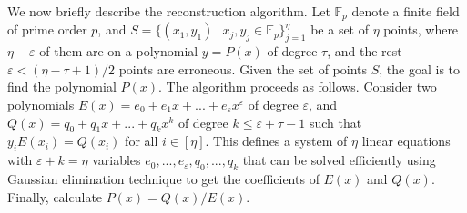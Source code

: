 \documentclass[letterpaper,twocolumn,10pt]{article}
\newcommand{\fullpaper}[1]{#1}
\newcommand{\fullpaper}[1]{}
\newcommand{\algFont}{\fontsize{10}{13}\selectfont}
\newcommand{\jared}[1]{}
\newcommand{\sfsize}{\fontsize{0.73\baselineskip}{0.73\baselineskip}\selectfont}
\newcommand{\sans}[1]{\textsf{\sfsize \mbox{#1}}}
\newcommand{\sansb}[1]{\textbf{\sans{\mbox{#1}}}}
\newcommand{\para}[1]{\vspace{0.55em} \noindent \sansb{{\mbox{#1}}}}
\newcommand{\brix}{\sans{TorBrix}\xspace}
\begin{document}
\jared{This paragraph can be deleted if we just cite the relevant papers that enable asynchronous secure multiparty computation.

\para{Secret Sharing.} A \emph{secret sharing} protocol allows a party (called \emph{the dealer}) to share a secret among $m$ parties such that any set of $\tau$ or fewer parties cannot gain any information about the secret, but any set of at least $\tau+1$ parties can reconstruct it. Shamir~\cite{shamir:how} proposed a secret sharing scheme, where the dealer shares a secret $s$ among $m$ parties by choosing a random polynomial $f(x)$ of degree $\tau$ such that ${f(0)=s}$. For all ${j \in [m]}$, the dealer sends $f(j)$ to the $j$-th party. Since at least ${\tau+1}$ points are required to reconstruct $f(x)$, no coalition of $\tau$ or less parties can reconstruct $s$.
The reconstruction algorithm requires a Reed-Solomon decoding algorithm~\cite{Reed-Solomon1960} to correct up to $1/3$ invalid shares sent by dishonest distributors. In our protocols, we use the error correcting algorithm of Berlekamp and Welch~\cite{Berlekamp:Welch:1986}.}

\fullpaper{We now briefly describe the reconstruction algorithm. Let $\mathbb{F}_{p}$ denote a finite field of prime order $p$, and $S=\{(x_{1},y_{1})\:|\:x_{j},y_{j}\in\mathbb{F}_{p}\}_{j=1}^{\eta}$ be a set of $\eta$ points, where $\eta-\varepsilon$ of them are on a polynomial $y=P(x)$ of degree $\tau$, and the rest $\varepsilon<(\eta-\tau+1)/2$ points are erroneous. Given the set of points $S$, the goal is to find the polynomial $P(x)$. The algorithm proceeds as follows. Consider two polynomials $E(x)=e_{0}+e_{1}x+...+e_{\varepsilon}x^{\varepsilon}$ of degree $\varepsilon$, and $Q(x)=q_{0}+q_{1}x+...+q_{k}x^{k}$ of degree $k\leq\varepsilon+\tau-1$ such that $y_{i}E(x_{i})=Q(x_{i})$ for all $i\in[\eta]$. This defines a system of $\eta$ linear equations with $\varepsilon+k=\eta$ variables $e_{0},...,e_{\varepsilon},q_{0},...,q_{k}$ that can be solved efficiently using Gaussian elimination technique to get the coefficients of $E(x)$ and $Q(x)$. Finally, calculate $P(x)=Q(x)/E(x)$.}

%	
\end{document}
